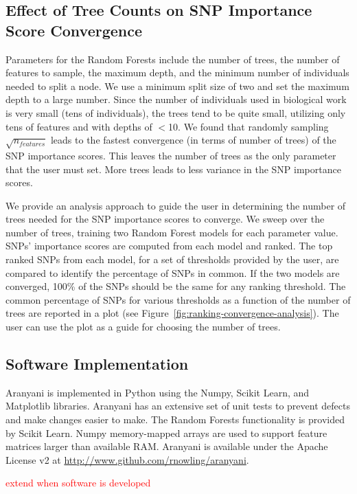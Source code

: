 \subsection{Effect of Tree Counts on SNP Importance Score Convergence}
Parameters for the Random Forests include the number of trees, the number of features to sample, the maximum depth, and the minimum number of individuals needed to split a node.  We use a minimum split size of two and set the maximum depth to a large number.  Since the number of individuals used in biological work is very small (tens of individuals), the trees tend to be quite small, utilizing only tens of features and with depths of $<$10.  We found that randomly sampling $\sqrt{n_{features}}$ leads to the fastest convergence (in terms of number of trees) of the SNP importance scores.  This leaves the number of trees as the only parameter that the user must set.  More trees leads to less variance in the SNP importance scores.

We provide an analysis approach to guide the user in determining the number of trees needed for the SNP importance scores to converge.  We sweep over the number of trees, training two Random Forest models for each parameter value.  SNPs' importance scores are computed from each model and ranked.  The top ranked SNPs from each model, for a set of thresholds provided by the user, are compared to identify the percentage of SNPs in common.  If the two models are converged, 100\% of the SNPs should be the same for any ranking threshold. The common percentage of SNPs for various thresholds as a function of the number of trees are reported in a plot (see Figure~\ref{fig:ranking-convergence-analysis}).  The user can use the plot as a guide for choosing the number of trees.

\subsection{Software Implementation}
Aranyani is implemented in Python using the Numpy, Scikit Learn, and Matplotlib libraries.  Aranyani has an extensive set of unit tests to prevent defects and make changes easier to make.  The Random Forests functionality is provided by Scikit Learn. Numpy memory-mapped arrays are used to support feature matrices larger than available RAM.   Aranyani is available under the Apache License v2 at \url{http://www.github.com/rnowling/aranyani}.

\textcolor{red}{extend when software is developed}

